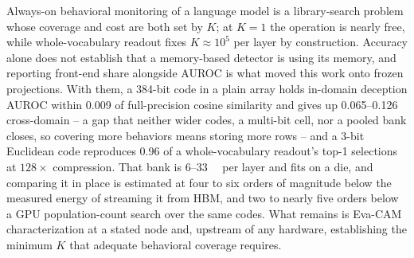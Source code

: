\documentclass[conference]{IEEEtran}
\newcommand{\auroc}{{AUROC}\xspace}
\begin{document}
Always-on behavioral monitoring of a language model is a
library-search problem whose coverage and cost are both set by $K$;
at $K=1$ the operation is nearly free, while whole-vocabulary readout
fixes $K\!\approx\!10^{5}$ per
layer by construction. Accuracy alone does not establish that a
memory-based detector is using its memory, and reporting front-end
share alongside \auroc is what moved this work onto frozen
projections. With them, a 384-bit code in a plain array holds
in-domain deception \auroc within 0.009 of full-precision cosine
similarity and gives up 0.065--0.126 cross-domain -- a gap that
neither wider codes, a multi-bit cell, nor a pooled bank closes, so
covering more behaviors means storing more rows -- and a 3-bit
Euclidean code reproduces 0.96 of a whole-vocabulary readout's top-1
selections at $128\times$ compression. That bank is
6--\qty{33}{\mega\byte} per layer and fits on a die, and comparing it
in place is estimated at four to six orders of magnitude below the
measured energy of streaming it from HBM, and two to nearly five
orders below a GPU population-count search over the same codes. What
remains is Eva-CAM characterization at a stated node and, upstream of
any hardware, establishing the minimum $K$ that adequate behavioral
coverage requires.



\end{document}
